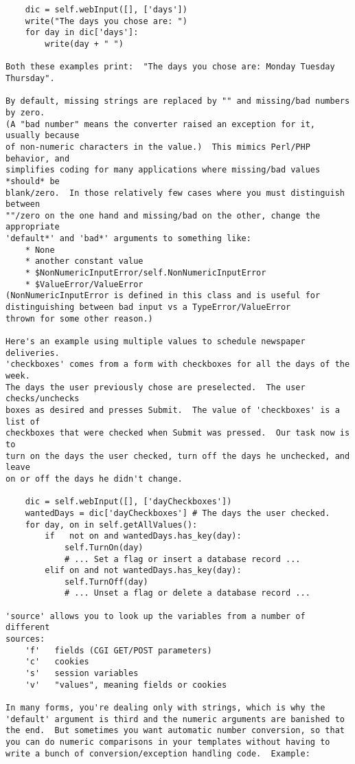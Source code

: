 \begin{verbatim}
    dic = self.webInput([], ['days'])
    write("The days you chose are: ")
    for day in dic['days']:
        write(day + " ")

Both these examples print:  "The days you chose are: Monday Tuesday Thursday".

By default, missing strings are replaced by "" and missing/bad numbers by zero.
(A "bad number" means the converter raised an exception for it, usually because
of non-numeric characters in the value.)  This mimics Perl/PHP behavior, and
simplifies coding for many applications where missing/bad values *should* be
blank/zero.  In those relatively few cases where you must distinguish between
""/zero on the one hand and missing/bad on the other, change the appropriate
'default*' and 'bad*' arguments to something like: 
    * None
    * another constant value
    * $NonNumericInputError/self.NonNumericInputError
    * $ValueError/ValueError
(NonNumericInputError is defined in this class and is useful for
distinguishing between bad input vs a TypeError/ValueError
thrown for some other reason.)

Here's an example using multiple values to schedule newspaper deliveries.
'checkboxes' comes from a form with checkboxes for all the days of the week.
The days the user previously chose are preselected.  The user checks/unchecks
boxes as desired and presses Submit.  The value of 'checkboxes' is a list of
checkboxes that were checked when Submit was pressed.  Our task now is to
turn on the days the user checked, turn off the days he unchecked, and leave
on or off the days he didn't change.

    dic = self.webInput([], ['dayCheckboxes'])
    wantedDays = dic['dayCheckboxes'] # The days the user checked.
    for day, on in self.getAllValues():
        if   not on and wantedDays.has_key(day):
            self.TurnOn(day)
            # ... Set a flag or insert a database record ...
        elif on and not wantedDays.has_key(day):
            self.TurnOff(day)
            # ... Unset a flag or delete a database record ...

'source' allows you to look up the variables from a number of different
sources:
    'f'   fields (CGI GET/POST parameters)
    'c'   cookies
    's'   session variables
    'v'   "values", meaning fields or cookies

In many forms, you're dealing only with strings, which is why the
'default' argument is third and the numeric arguments are banished to
the end.  But sometimes you want automatic number conversion, so that
you can do numeric comparisons in your templates without having to
write a bunch of conversion/exception handling code.  Example:


\end{verbatim}
